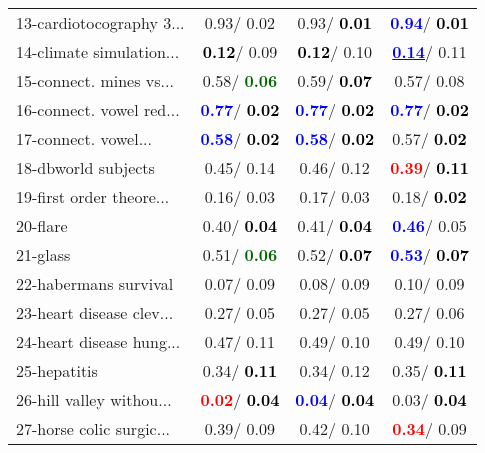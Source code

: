 \begin{table}[h]
\begin{center}
\begin{tabular}{lc|c|c}
13-cardiotocography 3... &   0.93/  0.02 &   0.93/\textcolor{black}{\textbf{  0.01}} & \textcolor{blue}{\textbf{  0.94}}/\textcolor{black}{\textbf{  0.01}} \\
14-climate simulation... & \textcolor{black}{\textbf{  0.12}}/  0.09 & \textcolor{black}{\textbf{  0.12}}/  0.10 & \underline{\textcolor{blue}{\textbf{  0.14}}}/  0.11 \\ \hline
15-connect. mines vs... &   0.58/\textcolor{darkgreen}{\textbf{  0.06}} &   0.59/\textcolor{black}{\textbf{  0.07}} &   0.57/  0.08 \\
16-connect. vowel red... & \textcolor{blue}{\textbf{  0.77}}/\textcolor{black}{\textbf{  0.02}} & \textcolor{blue}{\textbf{  0.77}}/\textcolor{black}{\textbf{  0.02}} & \textcolor{blue}{\textbf{  0.77}}/\textcolor{black}{\textbf{  0.02}} \\
17-connect. vowel... & \textcolor{blue}{\textbf{  0.58}}/\textcolor{black}{\textbf{  0.02}} & \textcolor{blue}{\textbf{  0.58}}/\textcolor{black}{\textbf{  0.02}} &   0.57/\textcolor{black}{\textbf{  0.02}} \\
18-dbworld subjects &   0.45/  0.14 &   0.46/  0.12 & \textcolor{red}{\textbf{  0.39}}/\textcolor{black}{\textbf{  0.11}} \\
19-first order theore... &   0.16/  0.03 &   0.17/  0.03 &   0.18/\textcolor{black}{\textbf{  0.02}} \\
20-flare &   0.40/\textcolor{black}{\textbf{  0.04}} &   0.41/\textcolor{black}{\textbf{  0.04}} & \textcolor{blue}{\textbf{  0.46}}/  0.05 \\
21-glass &   0.51/\textcolor{darkgreen}{\textbf{  0.06}} &   0.52/\textcolor{black}{\textbf{  0.07}} & \textcolor{blue}{\textbf{  0.53}}/\textcolor{black}{\textbf{  0.07}} \\ \hline
22-habermans survival &   0.07/  0.09 &   0.08/  0.09 &   0.10/  0.09 \\
23-heart disease clev... &   0.27/  0.05 &   0.27/  0.05 &   0.27/  0.06 \\
24-heart disease hung... &   0.47/  0.11 &   0.49/  0.10 &   0.49/  0.10 \\
25-hepatitis &   0.34/\textcolor{black}{\textbf{  0.11}} &   0.34/  0.12 &   0.35/\textcolor{black}{\textbf{  0.11}} \\
26-hill valley withou... & \textcolor{red}{\textbf{  0.02}}/\textcolor{black}{\textbf{  0.04}} & \textcolor{blue}{\textbf{  0.04}}/\textcolor{black}{\textbf{  0.04}} &   0.03/\textcolor{black}{\textbf{  0.04}} \\
27-horse colic surgic... &   0.39/  0.09 &   0.42/  0.10 & \textcolor{red}{\textbf{  0.34}}/  0.09 \\

\end{tabular}
\end{center}
\end{table}
